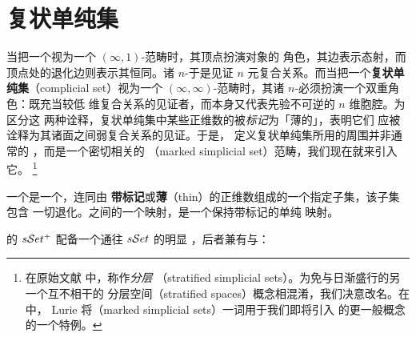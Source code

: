 

\section{复状单纯集}\label{sec:complicial-sets}

当把一个\trQuasiCategory{}视为一个 $(\infty,1)$-范畴时，其顶点扮演对象的
角色，其边表示态射，而顶点处的退化边则表示其恒同。诸 $n$-\trSimplex{}于是见证
$n$ 元复合关系。而当把一个\textbf{复状单纯集}（complicial set）视为一个
$(\infty,\infty)$-范畴时，其诸 $n$-\trSimplex{}必须扮演一个双重角色：既充当较低
维复合关系的见证者，而本身又代表先验不可逆的 $n$ 维胞腔。为区分这
两种诠释，复状单纯集中某些正维数的\trSimplex{}被\emph{标记}为「薄的」，表明它们
应被诠释为其\trBoundary{}诸面之间弱复合关系的\trEquivalence{}见证。于是，
定义复状单纯集所用的周围\trCategory{}并非通常\trSimplicialSet{}的%
\trCategory，而是一个密切相关的\textbf{%
\trMarkedSimplicialSet}（marked simplicial set）范畴，我们现在就来引入它。%
\footnote{在原始文献 \cite{bib128,bib129} 中，\trMarkedSimplicialSet{}称作\emph{分层%
\trSimplicialSet{}}（stratified simplicial sets）。为免与日渐盛行的另一个互不相干的
分层空间（stratified spaces）概念相混淆，我们决意改名。在 \cite{bib78} 中，
Lurie 将\emph{\trMarkedSimplicialSet{}}（marked simplicial sets）一词用于我们即将引入
的更一般概念的一个特例。}

\begin{definition}[\trMarkedSimplicialSet{}]\label{def:marked-simplicial-sets}
一个\textbf{\trMarkedSimplicialSet}是一个\trSimplicialSet，连同由\textbf{%
带标记}或\textbf{薄}（thin）的正维数\trSimplex{}组成的一个指定子集，该子集包含
一切退化\trSimplex{}。\trMarkedSimplicialSet{}之间的一个映射，是一个保持带标记\trSimplex{}的单纯
映射。
\end{definition}

\begin{definition}[极小标记与极大标记]\label{def:minimal-maximal-marking}
\trMarkedSimplicialSet{}的\trCategory{} $s\mathcal{S}et^{+}$ 配备一个通往 $s\mathcal{S}et$ 的明显%
\trForgetfulFunctor{}，后者兼有\trLeftAdjoint{}与\trRightAdjoint：
\begin{center}
\end{center}
\end{definition}

